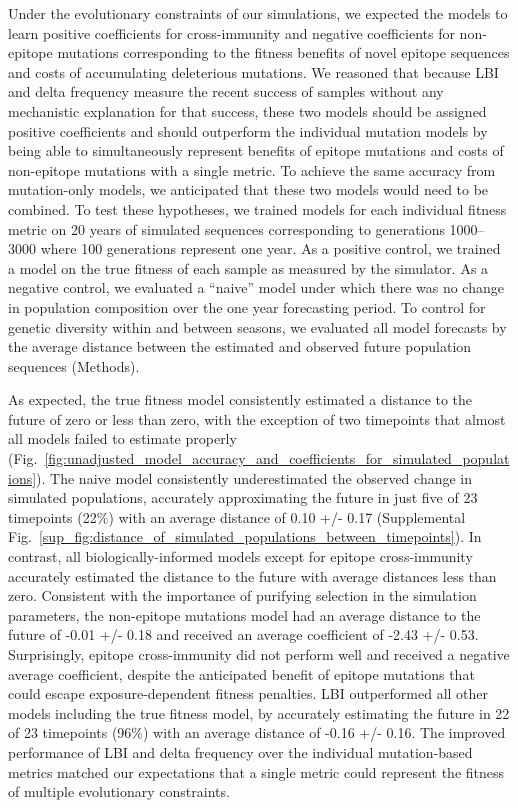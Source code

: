 Under the evolutionary constraints of our simulations, we expected the models to learn positive coefficients for cross-immunity and negative coefficients for non-epitope mutations corresponding to the fitness benefits of novel epitope sequences and costs of accumulating deleterious mutations.
We reasoned that because LBI and delta frequency measure the recent success of samples without any mechanistic explanation for that success, these two models should be assigned positive coefficients and should outperform the individual mutation models by being able to simultaneously represent benefits of epitope mutations and costs of non-epitope mutations with a single metric.
To achieve the same accuracy from mutation-only models, we anticipated that these two models would need to be combined.
To test these hypotheses, we trained models for each individual fitness metric on 20 years of simulated sequences corresponding to generations 1000--3000 where 100 generations represent one year.
As a positive control, we trained a model on the true fitness of each sample as measured by the simulator.
As a negative control, we evaluated a ``naive''  model under which there was no change in population composition over the one year forecasting period.
To control for genetic diversity within and between seasons, we evaluated all model forecasts by the average distance between the estimated and observed future population sequences (Methods).

As expected, the true fitness model consistently estimated a distance to the future of zero or less than zero, with the exception of two timepoints that almost all models failed to estimate properly (Fig.~\ref{fig:unadjusted_model_accuracy_and_coefficients_for_simulated_populations}).
The naive model consistently underestimated the observed change in simulated populations, accurately approximating the future in just five of 23 timepoints (22\%) with an average distance of 0.10 +/- 0.17 (Supplemental Fig.~\ref{sup_fig:distance_of_simulated_populations_between_timepoints}).
In contrast, all biologically-informed models except for epitope cross-immunity accurately estimated the distance to the future with average distances less than zero.
Consistent with the importance of purifying selection in the simulation parameters, the non-epitope mutations model had an average distance to the future of -0.01 +/- 0.18 and received an average coefficient of -2.43 +/- 0.53.
Surprisingly, epitope cross-immunity did not perform well and received a negative average coefficient, despite the anticipated benefit of epitope mutations that could escape exposure-dependent fitness penalties.
LBI outperformed all other models including the true fitness model, by accurately estimating the future in 22 of 23 timepoints (96\%) with an average distance of -0.16 +/- 0.16.
The improved performance of LBI and delta frequency over the individual mutation-based metrics matched our expectations that a single metric could represent the fitness of multiple evolutionary constraints.

